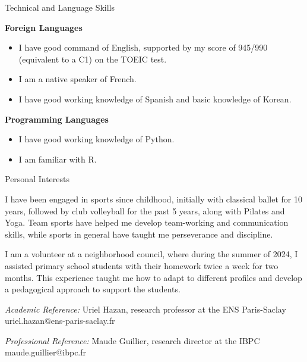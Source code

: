 \documentclass[
	10pt,
]{style} %
\begin{document}
\begin{rSection}{Technical and Language Skills}

	\textbf{Foreign Languages}
	\begin{itemize}[noitemsep, topsep=0pt, left=0pt]
		\item I have good command of English, supported by my score of 945/990 (equivalent to a C1) on the TOEIC test.
		\item I am a native speaker of French.
		\item I have good working knowledge of Spanish and basic knowledge of Korean.
	\end{itemize}
	\textbf{Programming Languages}
	\begin{itemize}[noitemsep, topsep=0pt, left=0pt]
		\item I have good working knowledge of Python.
		\item I am familiar with R.
	\end{itemize}

\end{rSection}



\begin{rSection}{Personal Interests}
	\vspace{-1em}
	\begin{rSubsection}{}{}{}{}
		\item I have been engaged in sports since childhood, initially with classical ballet for 10 years, followed by club volleyball for the past 5 years, along with Pilates and Yoga. Team sports have helped me develop team-working and communication skills, while sports in general have taught me perseverance and discipline.
		\item I am a volunteer at a neighborhood council, where during the summer of 2024, I assisted primary school students with their homework twice a week for two months. This experience taught me how to adapt to different profiles and develop a pedagogical approach to support the students.
	\end{rSubsection}

\end{rSection}



\begin{rReferences}
	\vspace{-0.5em}
    \item \textit{Academic Reference:} Uriel Hazan, research professor at the ENS Paris-Saclay uriel.hazan@ens-paris-saclay.fr
    \item \textit{Professional Reference:} Maude Guillier, research director at the IBPC maude.guillier@ibpc.fr
\end{rReferences}
\end{document}
